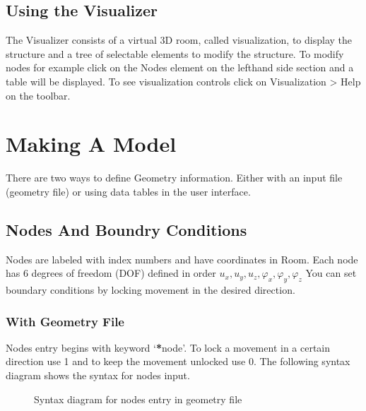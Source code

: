 \documentclass[letterpaper,10pt,english]{sphinxmanual}
\begin{document}
\noindent{}


\subsection{Using the Visualizer}
\label{\detokenize{getting_started:using-the-visualizer}}
\noindent{}

The Visualizer consists of a virtual 3D room, called visualization, to display the structure
and a tree of selectable elements to modify the structure.
To modify nodes for example click on the Nodes element on the left\sphinxhyphen{}hand side section and a table will be displayed.
To see visualization controls click on Visualization \sphinxhyphen{}\textgreater{} Help on the toolbar.


\section{Making A Model}
\label{\detokenize{making_a_model:making-a-model}}\label{\detokenize{making_a_model::doc}}
There are two ways to define Geometry information. Either with an input file (geometry file) or using data
tables in the user interface.


\subsection{Nodes And Boundry Conditions}
\label{\detokenize{making_a_model:nodes-and-boundry-conditions}}\label{\detokenize{making_a_model:nodes-input}}
Nodes are labeled with index numbers and have coordinates in Room.
Each node has 6 degrees of freedom (DOF) defined in order \(u_x, u_y, u_z, \varphi_x, \varphi_y, \varphi_z\)
You can set boundary conditions by locking movement in the desired direction.


\subsubsection{With Geometry File}
\label{\detokenize{making_a_model:with-geometry-file}}
Nodes entry begins with keyword ‘{\color{red}\bfseries{}*}node’.
To lock a movement in a certain direction use 1 and to keep the movement unlocked use 0.
The following syntax diagram shows the syntax for nodes input.

\begin{figure}[htbp]
\centering
\capstart

\noindent{}
\caption{Syntax diagram for nodes entry in geometry file}\label{\detokenize{making_a_model:id21}}\end{figure}
\end{document}
